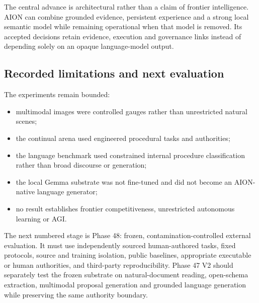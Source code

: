 The central advance is architectural rather than a claim of frontier
intelligence.  AION can combine grounded evidence, persistent experience and
a strong local semantic model while remaining operational when that model is
removed.  Its accepted decisions retain evidence, execution and governance
links instead of depending solely on an opaque language-model output.

\subsection{Recorded limitations and next evaluation}

The experiments remain bounded:
\begin{itemize}
    \item multimodal images were controlled gauges rather than unrestricted
    natural scenes;
    \item the continual arena used engineered procedural tasks and authorities;
    \item the language benchmark used constrained internal procedure
    classification rather than broad discourse or generation;
    \item the local Gemma substrate was not fine-tuned and did not become an
    AION-native language generator;
    \item no result establishes frontier competitiveness, unrestricted
    autonomous learning or AGI.
\end{itemize}

The next numbered stage is Phase 48: frozen, contamination-controlled external
evaluation.  It must use independently sourced human-authored tasks, fixed
protocols, source and training isolation, public baselines, appropriate
executable or human authorities, and third-party reproducibility.  Phase 47
V2 should separately test the frozen substrate on natural-document reading,
open-schema extraction, multimodal proposal generation and grounded language
generation while preserving the same authority boundary.
